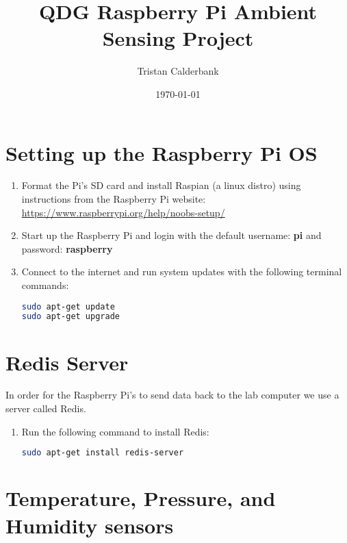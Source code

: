 \documentclass[a4paper,12pt]{article}
\title{QDG Raspberry Pi Ambient Sensing Project}
\date{\today}
\author{Tristan Calderbank}
\begin{document}
\maketitle
\tableofcontents

\section{Setting up the Raspberry Pi OS}

\sloppy
\begin{enumerate}

\item Format the Pi's SD card and install Raspian (a linux distro) using instructions from the Raspberry Pi website: \href{https://www.raspberrypi.org/help/noobs-setup/}{https://www.raspberrypi.org/help/noobs-setup/}
\item Start up the Raspberry Pi and login with the default username: \textbf{pi} and password: \textbf{raspberry}

\item Connect to the internet and run system updates with the following terminal commands:

\begin{lstlisting}[language=bash]
sudo apt-get update
sudo apt-get upgrade
\end{lstlisting}

\end{enumerate}

\section{Redis Server}

In order for the Raspberry Pi's to send data back to the lab computer we use a server called Redis.

\begin{enumerate}

\item Run the following command to install Redis:
\begin{lstlisting}[language=bash]
sudo apt-get install redis-server
\end{lstlisting}



\end{enumerate}

\section{Temperature, Pressure, and Humidity sensors}
\end{document}
